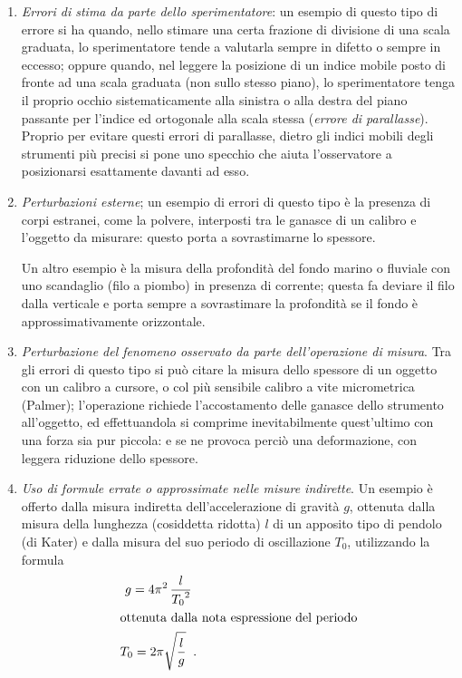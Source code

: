 \begin{enumerate}
  Si pu\`o naturalmente commettere un errore anche usando lo
  strumento a 20\gra{}C, quando ci\`o che interessa in
  realt\`a \`e conoscere il valore di una grandezza
  dipendente dalla temperatura (la lunghezza di un oggetto,
  il volume di un corpo, la resistenza elettrica di un filo
  o qualsiasi altra) ad una temperatura diversa da
  20\gra{}C.
\item \emph{Errori di stima da parte dello sperimentatore}:
  un esempio di questo tipo di errore si ha quando, nello
  stimare una certa frazione di divisione di una scala
  graduata, lo sperimentatore tende a valutarla sempre in
  difetto o sempre in eccesso; oppure quando, nel leggere la
  posizione di un indice mobile posto di fronte ad una scala
  graduata (non sullo stesso piano), lo sperimentatore tenga
  il proprio occhio sistematicamente alla sinistra o alla
  destra del piano passante per l'indice ed ortogonale alla
  scala stessa (\emph{errore di parallasse}).  Proprio per
  evitare questi errori di parallasse, dietro gli indici
  mobili degli strumenti pi\`u precisi si pone uno specchio
  che aiuta l'osservatore a posizionarsi esattamente davanti
  ad esso.
\item \emph{Perturbazioni esterne}; un esempio di errori di
  questo tipo \`e la presenza di corpi estranei, come la
  polvere, interposti tra le ganasce di un calibro e
  l'oggetto da misurare: questo porta a sovrastimarne lo
  spessore.

  Un altro esempio \`e la misura della profondit\`a del
  fondo marino o fluviale con uno scandaglio (filo a piombo)
  in presenza di corrente; questa fa deviare il filo dalla
  verticale e porta sempre a sovrastimare la profondit\`a se
  il fondo \`e approssimativamente orizzontale.
\item \emph{Perturbazione del fenomeno osservato da parte
    dell'operazione di misura}.  Tra gli errori di questo
  tipo si pu\`o citare la misura dello spessore di un
  oggetto con un calibro a cursore, o col pi\`u sensibile
  calibro a vite micrometrica (Palmer); l'operazione
  richiede l'accostamento delle ganasce dello strumento
  all'oggetto, ed effettuandola si comprime inevitabilmente
  quest'ultimo con una forza sia pur piccola: e se ne
  provoca perci\`o una deformazione, con leggera riduzione
  dello spessore.
\item \label{li:2.forapp} \emph{Uso di formule errate o
    approssimate nelle misure indirette}.  Un esempio \`e
  offerto dalla misura indiretta dell'accelerazione di
  gravit\`a $g$, ottenuta dalla misura della lunghezza
  (cosiddetta ridotta) $l$ di un apposito tipo di pendolo
  (di Kater) e dalla misura del suo periodo di oscillazione
  $T_0$, utilizzando la formula
  \begin{gather}%
  \index{pendolo, periodo del|(}
    g = 4 \pi^2 \, \frac{l}{{T_0}^2} \label{eq:2.g} \\
    \intertext{ottenuta dalla nota espressione del periodo}
    T_0 = 2 \pi \sqrt{ \frac{l}{g} } \peq . \label{eq:2.t0}
  \end{gather}


\end{enumerate}
